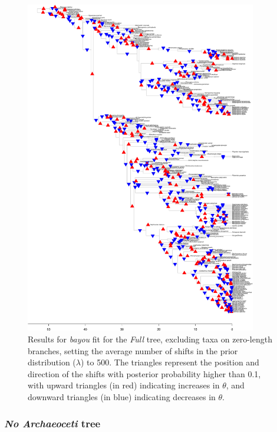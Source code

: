 \begin{figure}[H]
\includegraphics[width=0.9\textwidth]{img/plots-full-k500-1.pdf}
\caption{Results for \textit{bayou} fit for the \textit{Full} tree, excluding taxa on zero-length branches, setting the average number of shifts in the prior distribution ($\lambda$) to 500. The triangles represent the position and direction of the shifts with posterior probability higher than 0.1, with upward triangles (in red) indicating increases in $\theta$, and downward triangles (in blue) indicating decreases in $\theta$.}
\label{fig:full-k500-nzlb}
\end{figure}

\subsubsection{\textit{No Archaeoceti} tree}

